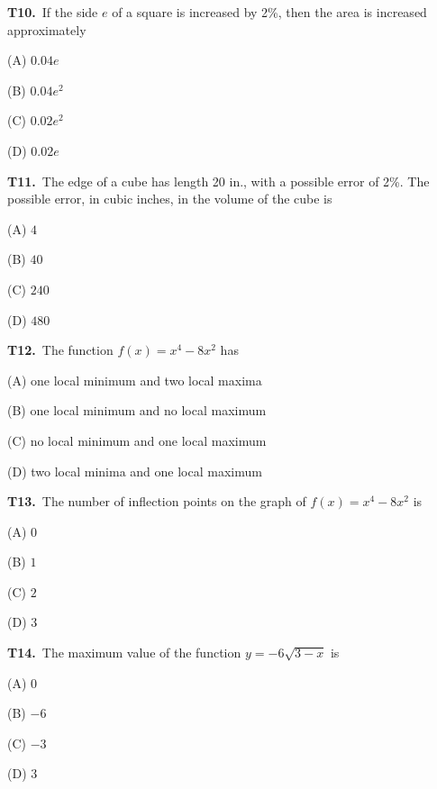 \documentclass[11pt]{article}
\begin{document}
\bigskip\noindent\textbf{T10.}\ If the side $e$ of a square is increased by 2\%, then the area is increased approximately
\begin{list}{}{\setlength{\leftmargin}{3em}\setlength{\labelwidth}{2.5em}\setlength{\itemsep}{0pt}\setlength{\topsep}{2pt}}
\item[(A)] $0.04e$
\item[(B)] $0.04e^2$
\item[(C)] $0.02e^2$
\item[(D)] $0.02e$
\end{list}

\bigskip\noindent\textbf{T11.}\ The edge of a cube has length 20 in., with a possible error of 2\%. The possible error, in cubic inches, in the volume of the cube is
\begin{list}{}{\setlength{\leftmargin}{3em}\setlength{\labelwidth}{2.5em}\setlength{\itemsep}{0pt}\setlength{\topsep}{2pt}}
\item[(A)] $4$
\item[(B)] $40$
\item[(C)] $240$
\item[(D)] $480$
\end{list}

\bigskip\noindent\textbf{T12.}\ The function $f(x) = x^4 - 8x^2$ has
\begin{list}{}{\setlength{\leftmargin}{3em}\setlength{\labelwidth}{2.5em}\setlength{\itemsep}{0pt}\setlength{\topsep}{2pt}}
\item[(A)] one local minimum and two local maxima
\item[(B)] one local minimum and no local maximum
\item[(C)] no local minimum and one local maximum
\item[(D)] two local minima and one local maximum
\end{list}

\bigskip\noindent\textbf{T13.}\ The number of inflection points on the graph of $f(x) = x^4 - 8x^2$ is
\begin{list}{}{\setlength{\leftmargin}{3em}\setlength{\labelwidth}{2.5em}\setlength{\itemsep}{0pt}\setlength{\topsep}{2pt}}
\item[(A)] $0$
\item[(B)] $1$
\item[(C)] $2$
\item[(D)] $3$
\end{list}

\bigskip\noindent\textbf{T14.}\ The maximum value of the function $y = -6\sqrt{3-x}$ is
\begin{list}{}{\setlength{\leftmargin}{3em}\setlength{\labelwidth}{2.5em}\setlength{\itemsep}{0pt}\setlength{\topsep}{2pt}}
\item[(A)] $0$
\item[(B)] $-6$
\item[(C)] $-3$
\item[(D)] $3$
\end{list}
\end{document}
